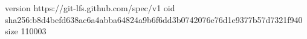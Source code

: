 version https://git-lfs.github.com/spec/v1
oid sha256:b8d4befd638ac6a4abba64824a9b6f6dd3b0742076e76d1e9377b57d7321f940
size 110003
